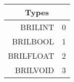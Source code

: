 \begin{tabular}{|r|l|}\hline
\multicolumn{2}{|c|}{Types}\\ \hline
BRILINT & 0 \\ \hline
BRILBOOL & 1 \\ \hline
BRILFLOAT & 2 \\ \hline
BRILVOID & 3 \\ \hline
\end{tabular}
